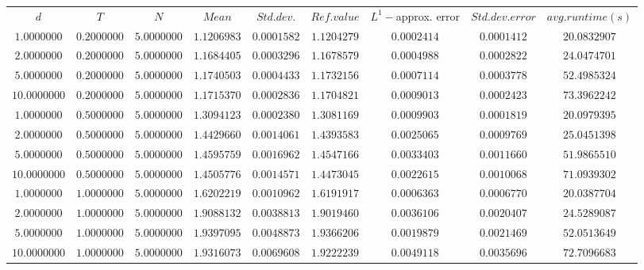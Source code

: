 \begin{tabular}{ccccccccc}
$d$ & $T$ & $N$ & $Mean$ & $Std. dev.$ & $Ref. value$ & $L^1-$approx. error & $Std. dev. error$ & $avg. runtime (s)$\\
$1.0000000$ & $0.2000000$ & $5.0000000$ & $1.1206983$ & $0.0001582$ & $1.1204279$ & $0.0002414$ & $0.0001412$ & $20.0832907$\\
$2.0000000$ & $0.2000000$ & $5.0000000$ & $1.1684405$ & $0.0003296$ & $1.1678579$ & $0.0004988$ & $0.0002822$ & $24.0474701$\\
$5.0000000$ & $0.2000000$ & $5.0000000$ & $1.1740503$ & $0.0004433$ & $1.1732156$ & $0.0007114$ & $0.0003778$ & $52.4985324$\\
$10.0000000$ & $0.2000000$ & $5.0000000$ & $1.1715370$ & $0.0002836$ & $1.1704821$ & $0.0009013$ & $0.0002423$ & $73.3962242$\\
$1.0000000$ & $0.5000000$ & $5.0000000$ & $1.3094123$ & $0.0002380$ & $1.3081169$ & $0.0009903$ & $0.0001819$ & $20.0979395$\\
$2.0000000$ & $0.5000000$ & $5.0000000$ & $1.4429660$ & $0.0014061$ & $1.4393583$ & $0.0025065$ & $0.0009769$ & $25.0451398$\\
$5.0000000$ & $0.5000000$ & $5.0000000$ & $1.4595759$ & $0.0016962$ & $1.4547166$ & $0.0033403$ & $0.0011660$ & $51.9865510$\\
$10.0000000$ & $0.5000000$ & $5.0000000$ & $1.4505776$ & $0.0014571$ & $1.4473045$ & $0.0022615$ & $0.0010068$ & $71.0939302$\\
$1.0000000$ & $1.0000000$ & $5.0000000$ & $1.6202219$ & $0.0010962$ & $1.6191917$ & $0.0006363$ & $0.0006770$ & $20.0387704$\\
$2.0000000$ & $1.0000000$ & $5.0000000$ & $1.9088132$ & $0.0038813$ & $1.9019460$ & $0.0036106$ & $0.0020407$ & $24.5289087$\\
$5.0000000$ & $1.0000000$ & $5.0000000$ & $1.9397095$ & $0.0048873$ & $1.9366206$ & $0.0019879$ & $0.0021469$ & $52.0513649$\\
$10.0000000$ & $1.0000000$ & $5.0000000$ & $1.9316073$ & $0.0069608$ & $1.9222239$ & $0.0049118$ & $0.0035696$ & $72.7096683$\\
\end{tabular}
